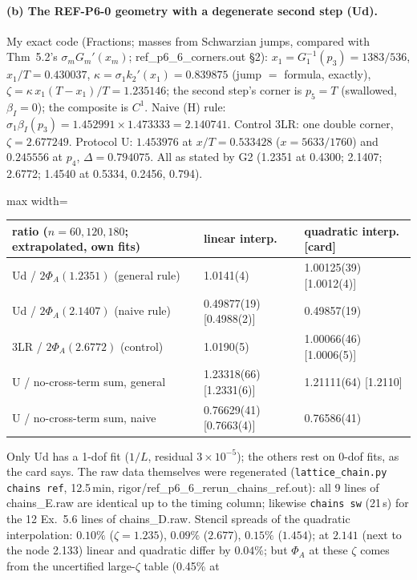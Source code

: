 \documentclass[11pt]{article}
\begin{document}
\paragraph{(b) The REF-P6-0 geometry with a degenerate second step (Ud).} My exact code (Fractions; masses from
Schwarzian jumps, compared with Thm~5.2's $\sigma_mG_m'(x_m)$; ref\_p6\_6\_corners.out \S2):
$x_1=G_1^{-1}(p_3)=1383/536$, $x_1/T=0.430037$, $\kappa=\sigma_1k_2'(x_1)=0.839875$ (jump $=$ formula, exactly),
$\zeta=\kappa\,x_1(T-x_1)/T=1.235146$; the second step's corner is $p_5=T$ (swallowed, $\beta_I=0$); the composite is
$C^1$. Naive (H) rule: $\sigma_1\beta_I(p_3)=1.452991\times1.473333=2.140741$. Control 3LR: one double corner,
$\zeta=2.677249$. Protocol U: $1.453976$ at $x/T=0.533428$ ($x=5633/1760$) and $0.245556$ at $p_4$,
$\Delta=0.794075$. All as stated by G2 (1.2351 at 0.4300; 2.1407; 2.6772; 1.4540 at 0.5334, 0.2456, 0.794).
\begin{center}\small
\begin{adjustbox}{max width=\textwidth}\begin{tabular}{lll}
\toprule
ratio ($n=60,120,180$; extrapolated, own fits) & linear interp. & quadratic interp. [card]\\
\midrule
Ud / $2\Phi_A(1.2351)$ (general rule) & 1.0141(4) & 1.00125(39) [1.0012(4)]\\
Ud / $2\Phi_A(2.1407)$ (naive rule) & 0.49877(19) [0.4988(2)] & 0.49857(19)\\
3LR / $2\Phi_A(2.6772)$ (control) & 1.0190(5) & 1.00066(46) [1.0006(5)]\\
U / no-cross-term sum, general & 1.23318(66) [1.2331(6)] & 1.21111(64) [1.2110]\\
U / no-cross-term sum, naive & 0.76629(41) [0.7663(4)] & 0.76586(41)\\
\bottomrule
\end{tabular}\end{adjustbox}
\end{center}
Only Ud has a 1-dof fit ($1/L$, residual $3\times10^{-5}$); the others rest on 0-dof fits, as the card says. The raw data themselves were regenerated (\texttt{lattice\_chain.py chains ref}, 12.5\,min, rigor/ref\_p6\_6\_rerun\_chains\_ref.out): all 9 lines of chains\_E.raw are identical up to the timing column; likewise \texttt{chains sw} (21\,s) for the 12 Ex.~5.6 lines of chains\_D.raw.
Stencil spreads of the quadratic interpolation: $0.10\%$ ($\zeta=1.235$), $0.09\%$ ($2.677$), $0.15\%$ ($1.454$); at $2.141$ (next to the node 2.133) linear and quadratic differ by $0.04\%$; but $\Phi_A$ at these $\zeta$ comes from the uncertified large-$\zeta$ table (0.45\% at
\end{document}
